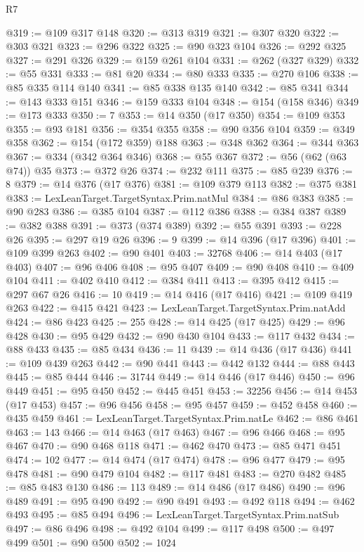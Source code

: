 \begin{lexlean}{R7}
\begin{coremodule}
@319 := @109 @317 @148
@320 := @313 @319
@321 := @307 @320
@322 := @303 @321
@323 := @296 @322
@325 := @90 @323 @104
@326 := @292 @325
@327 := @291 @326
@329 := @159 @261 @104
@331 := @262 (@327 @329)
@332 := @55 @331
@333 := @81 @20
@334 := @80 @333
@335 := @270 @106
@338 := @85 @335 @114 @140
@341 := @85 @338 @135 @140
@342 := @85 @341
@344 := @143 @333 @151
@346 := @159 @333 @104
@348 := @154 (@158 @346)
@349 := @173 @333
@350 := 7
@353 := @14 @350 (@17 @350)
@354 := @109 @353
@355 := @93 @181
@356 := @354 @355
@358 := @90 @356 @104
@359 := @349 @358
@362 := @154 (@172 @359) @188
@363 := @348 @362
@364 := @344 @363
@367 := @334 (@342 @364 @346)
@368 := @55 @367
@372 := @56 (@62 (@63 @74)) @35
@373 := @372 @26
@374 := @232 @111
@375 := @85 @239
@376 := 8
@379 := @14 @376 (@17 @376)
@381 := @109 @379 @113
@382 := @375 @381
@383 := LexLeanTarget.TargetSyntax.Prim.natMul
@384 := @86 @383
@385 := @90 @283
@386 := @385 @104
@387 := @112 @386
@388 := @384 @387
@389 := @382 @388
@391 := @373 (@374 @389)
@392 := @55 @391
@393 := @228 @26
@395 := @297 @19 @26
@396 := 9
@399 := @14 @396 (@17 @396)
@401 := @109 @399 @263
@402 := @90 @401
@403 := 32768
@406 := @14 @403 (@17 @403)
@407 := @96 @406
@408 := @95 @407
@409 := @90 @408
@410 := @409 @104
@411 := @402 @410
@412 := @384 @411
@413 := @395 @412
@415 := @297 @67 @26
@416 := 10
@419 := @14 @416 (@17 @416)
@421 := @109 @419 @263
@422 := @415 @421
@423 := LexLeanTarget.TargetSyntax.Prim.natAdd
@424 := @86 @423
@425 := 255
@428 := @14 @425 (@17 @425)
@429 := @96 @428
@430 := @95 @429
@432 := @90 @430 @104
@433 := @117 @432
@434 := @88 @433
@435 := @85 @434
@436 := 11
@439 := @14 @436 (@17 @436)
@441 := @109 @439 @263
@442 := @90 @441
@443 := @442 @132
@444 := @88 @443
@445 := @85 @444
@446 := 31744
@449 := @14 @446 (@17 @446)
@450 := @96 @449
@451 := @95 @450
@452 := @445 @451
@453 := 32256
@456 := @14 @453 (@17 @453)
@457 := @96 @456
@458 := @95 @457
@459 := @452 @458
@460 := @435 @459
@461 := LexLeanTarget.TargetSyntax.Prim.natLe
@462 := @86 @461
@463 := 143
@466 := @14 @463 (@17 @463)
@467 := @96 @466
@468 := @95 @467
@470 := @90 @468 @118
@471 := @462 @470
@473 := @85 @471 @451
@474 := 102
@477 := @14 @474 (@17 @474)
@478 := @96 @477
@479 := @95 @478
@481 := @90 @479 @104
@482 := @117 @481
@483 := @270 @482
@485 := @85 @483 @130
@486 := 113
@489 := @14 @486 (@17 @486)
@490 := @96 @489
@491 := @95 @490
@492 := @90 @491
@493 := @492 @118
@494 := @462 @493
@495 := @85 @494
@496 := LexLeanTarget.TargetSyntax.Prim.natSub
@497 := @86 @496
@498 := @492 @104
@499 := @117 @498
@500 := @497 @499
@501 := @90 @500
@502 := 1024

\end{coremodule}
\end{lexlean}
